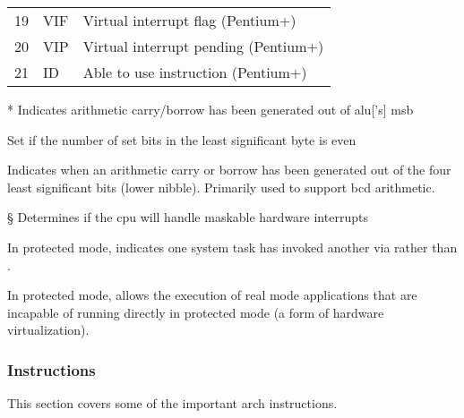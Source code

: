 \begin{table*}
\begin{threeparttable}
\begin{tabular}{rAl}
      19 & VIF & Virtual interrupt flag (Pentium+) \\
      20 & VIP & Virtual interrupt pending (Pentium+) \\
      21 & ID & Able to use  instruction (Pentium+) \\
      \bottomrule
    \end{tabular}
      \begin{tablenotes}
        \item[*] Indicates arithmetic carry/borrow has been generated out of \gls{alu}['s]
          \gls{msb}
        \item[\dag] Set if the number of set bits in the least significant byte is even
        \item[\ddag] Indicates when an arithmetic carry or borrow has been generated
          out of the four least significant bits (lower nibble).
          Primarily used to support \gls{bcd} arithmetic.
        \item[\S] Determines if the \gls{cpu} will handle maskable hardware interrupts
        \item[\textbardbl] In protected mode, indicates one system task
          has invoked another via  rather than .
        \item[\textpilcrow] In protected mode, allows the execution of real mode
          applications that are incapable of running directly in protected mode
          (a form of hardware virtualization).
      \end{tablenotes}
  \end{threeparttable}
\end{table*}

\subsubsection{Instructions}
This section covers some of the important \gls{arch} instructions.

